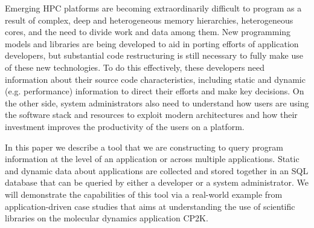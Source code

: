 Emerging HPC platforms are becoming extraordinarily difficult to program as a result of complex, deep and heterogeneous memory hierarchies, heterogeneous cores, and the need to divide work and data among them.
New programming models and libraries are being developed to aid in porting efforts of application developers, but substantial code restructuring is still necessary to fully make use of these new technologies.
To do this effectively, these developers need information about their source code characteristics, including static and dynamic (e.g. performance) information to direct their efforts and make key decisions.
On the other side, system administrators also need to understand how users are using the software stack and resources to exploit modern architectures and how their investment improves the productivity of the users on a platform.

In this paper we describe a tool that we are constructing to query program information at the level of an application or across multiple applications.
Static and dynamic data about applications are collected and stored together in an \acs{SQL} database that can be queried by either a developer or a system administrator.
We will demonstrate the capabilities of this tool via a real-world example from application-driven case studies that aims at understanding the use of scientific libraries on the molecular dynamics application CP2K.

